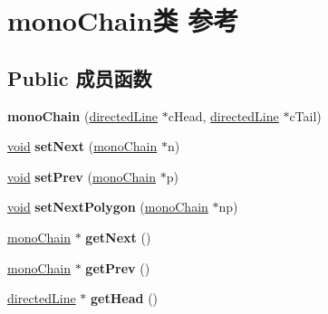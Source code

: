 \hypertarget{classmono_chain}{}\section{mono\+Chain类 参考}
\label{classmono_chain}
\subsection*{Public 成员函数}
\begin{DoxyCompactItemize}
\item 
\mbox{\label{classmono_chain_a72b3fa50e95b6a75ecf7bf5f5ea58f44}} 
{\bfseries mono\+Chain} (\hyperlink{classdirected_line}{directed\+Line} $\ast$c\+Head, \hyperlink{classdirected_line}{directed\+Line} $\ast$c\+Tail)
\item 
\mbox{\label{classmono_chain_ade9501c665166edc0dbc80527bfebf1a}} 
\hyperlink{interfacevoid}{void} {\bfseries set\+Next} (\hyperlink{classmono_chain}{mono\+Chain} $\ast$n)
\item 
\mbox{\label{classmono_chain_aa320956f471fad5adbc4b7927236b066}} 
\hyperlink{interfacevoid}{void} {\bfseries set\+Prev} (\hyperlink{classmono_chain}{mono\+Chain} $\ast$p)
\item 
\mbox{\label{classmono_chain_abc1b146f8a7787a841dbbc034fb6142d}} 
\hyperlink{interfacevoid}{void} {\bfseries set\+Next\+Polygon} (\hyperlink{classmono_chain}{mono\+Chain} $\ast$np)
\item 
\mbox{\label{classmono_chain_afe3c50fb50dda770878480bdefeca7c1}} 
\hyperlink{classmono_chain}{mono\+Chain} $\ast$ {\bfseries get\+Next} ()
\item 
\mbox{\label{classmono_chain_aa726a0f7c111c3d1d2e573739e2cd880}} 
\hyperlink{classmono_chain}{mono\+Chain} $\ast$ {\bfseries get\+Prev} ()
\item 
\mbox{\label{classmono_chain_a091071d4a0218aa9135080ac50a45c11}} 
\hyperlink{classdirected_line}{directed\+Line} $\ast$ {\bfseries get\+Head} ()
\item 
\mbox{\label{classmono_chain_a2e45eb54f1a9ab598eee729a428ee884}} 

\end{DoxyCompactItemize}
